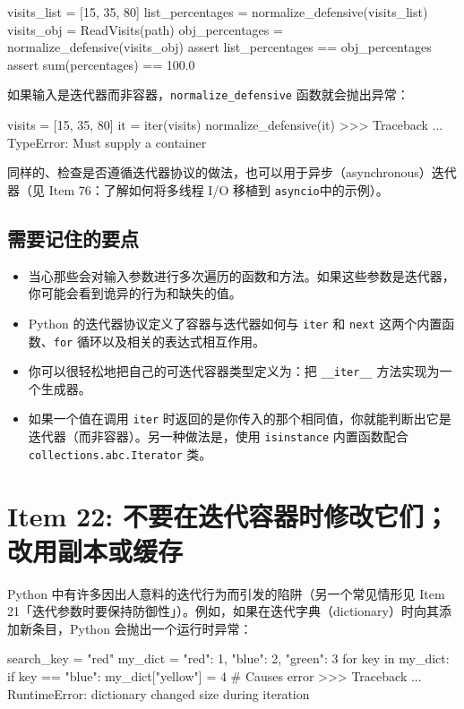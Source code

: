 \begin{codebox}[python]
visits_list = [15, 35, 80]
list_percentages = normalize_defensive(visits_list)
visits_obj = ReadVisits(path)
obj_percentages = normalize_defensive(visits_obj)
assert list_percentages == obj_percentages
assert sum(percentages) == 100.0
\end{codebox}

如果输入是迭代器而非容器，\texttt{normalize\_defensive} 函数就会抛出异常：

\begin{codebox}[python]
visits = [15, 35, 80]
it = iter(visits)
normalize_defensive(it)
>>>
Traceback ...
TypeError: Must supply a container
\end{codebox}

同样的、检查是否遵循迭代器协议的做法，也可以用于异步（asynchronous）迭代器（见 Item 76：了解如何将多线程 I/O 移植到 \texttt{asyncio}中的示例）。

\subsection{需要记住的要点}

\begin{itemize}
\item 当心那些会对输入参数进行多次遍历的函数和方法。如果这些参数是迭代器，你可能会看到诡异的行为和缺失的值。
\item Python 的迭代器协议定义了容器与迭代器如何与 \texttt{iter} 和 \texttt{next} 这两个内置函数、\texttt{for} 循环以及相关的表达式相互作用。
\item 你可以很轻松地把自己的可迭代容器类型定义为：把 \texttt{\_\_iter\_\_} 方法实现为一个生成器。
\item 如果一个值在调用 \texttt{iter} 时返回的是你传入的那个相同值，你就能判断出它是迭代器（而非容器）。另一种做法是，使用 \texttt{isinstance} 内置函数配合 \texttt{collections.abc.Iterator} 类。
\end{itemize}

\section{Item 22: 不要在迭代容器时修改它们；改用副本或缓存}

Python 中有许多因出人意料的迭代行为而引发的陷阱（另一个常见情形见 Item 21「迭代参数时要保持防御性」）。例如，如果在迭代字典（dictionary）时向其添加新条目，Python 会抛出一个运行时异常：

\begin{codebox}[python]
search_key = "red"
my_dict = {"red": 1, "blue": 2, "green": 3}
for key in my_dict:
    if key == "blue":
        my_dict["yellow"] = 4  # Causes error
>>>
Traceback ...
RuntimeError: dictionary changed size during iteration
\end{codebox}

